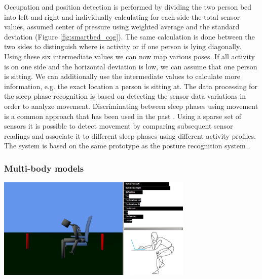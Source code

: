 Occupation and position detection is performed by dividing the two person bed into left and right and individually calculating for each side the total sensor values, assumed center of pressure using weighted average and the standard deviation (Figure \ref{fig:smartbed_cog}). The same calculation is done between the two sides to distinguish where is activity or if one person is lying diagonally.
Using these six intermediate values we can now map various poses. If all activity is on one side and the horizontal deviation is low, we can assume that one person is sitting. We can additionally use the intermediate values to calculate more information, e.g. the exact location a person is sitting at. 
The data processing for the sleep phase recognition is based on detecting the sensor data variations in order to analyze movement. Discriminating between sleep phases using movement is a common approach that has been used in the past \cite{salmi86}. Using a sparse set of sensors it is possible to detect movement by comparing subsequent sensor readings and associate it to different sleep phases using different activity profiles. The system is based on the same prototype as the posture recognition system \cite{Djakow2013movibed}.
\subsubsection{Multi-body models}
\begin{minipage}{\linewidth}
\centering
\includegraphics[width=0.7\textwidth]{images/smartchair_software}
\label{fig:smartchair_software}
\end{minipage}

